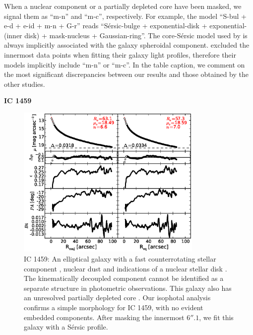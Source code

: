 \documentclass[preprint2]{emulateapj}
\newcommand{\fitfigurewidth}{0.8\textwidth}
\begin{document}
  When a nuclear component or a partially depleted core have been masked, we signal them as ``m-n'' and ``m-c'', respectively.
  For example, the model ``S-bul + e-d + e-id + m-n + G-r'' reads ``S\'ersic-bulge + exponential-disk + exponential-(inner disk) + mask-nucleus + Gaussian-ring''. 
  The core-S\'ersic model used by \cite{rusli2013} is always implicitly associated with the galaxy spheroidal component. 
  \citeauthor{grahamdriver2007} excluded the innermost data points when fitting their galaxy light profiles,  
  therefore their models implicitly include ``m-n'' or ``m-c''. 
  In the table caption, we comment on the most significant discrepancies between our results and those obtained by the other studies. 

  \clearpage\newpage\noindent
  {\bf IC 1459 \\}

  \begin{figure}[h]
  \begin{center}
  \includegraphics[width=\fitfigurewidth]{ic1459_1Dfit.eps}
  \caption{IC 1459: 
  An elliptical galaxy with a fast counterrotating stellar component \citep{franxillingworth1988ic1459,cappellari2002ic1459},
  nuclear dust and indications of a nuclear stellar disk \citep{forbes1994ic1459}.
  The kinematically decoupled component cannot be identified as a separate structure in photometric observations.
  This galaxy also has an unresolved partially depleted core \citep{rusli2013}.  %
  Our isophotal analysis confirms a simple morphology for IC 1459, with no evident embedded components.
  After masking the innermost $6''.1$, we fit this galaxy with a S\'ersic profile.  }
  \end{center}
  \end{figure}
\end{document}
